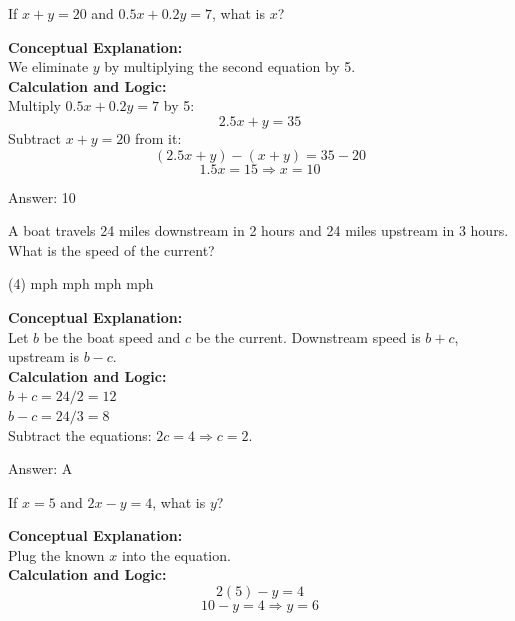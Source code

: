 \documentclass[11pt,paper=a4,answers]{exam}
\begin{document}
\begin{questions}
\question
If $x + y = 20$ and $0.5x + 0.2y = 7$, what is $x$?

\begin{solution}
\textbf{Conceptual Explanation:} \\
We eliminate $y$ by multiplying the second equation by 5.
\\[10pt]
\textbf{Calculation and Logic:} \\
Multiply $0.5x + 0.2y = 7$ by 5:
\[2.5x + y = 35\]
Subtract $x + y = 20$ from it:
\[(2.5x + y) - (x + y) = 35 - 20\]
\[1.5x = 15 \Rightarrow x = 10\]

\vspace{15pt}
Answer: \colorbox{yellow!100}{10}
\end{solution}

\question
A boat travels 24 miles downstream in 2 hours and 24 miles upstream in 3 hours. What is the speed of the current?
\begin{tasks}(4)
     mph
     mph
     mph
     mph
\end{tasks}

\begin{solution}
\textbf{Conceptual Explanation:} \\
Let $b$ be the boat speed and $c$ be the current. Downstream speed is $b+c$, upstream is $b-c$.
\\[10pt]
\textbf{Calculation and Logic:} \\
$b + c = 24 / 2 = 12$ \\
$b - c = 24 / 3 = 8$ \\
Subtract the equations: $2c = 4 \Rightarrow c = 2$.

\vspace{15pt}
Answer: \colorbox{yellow!100}{A}
\end{solution}

\question
If $x = 5$ and $2x - y = 4$, what is $y$?

\begin{solution}
\textbf{Conceptual Explanation:} \\
Plug the known $x$ into the equation.
\\[10pt]
\textbf{Calculation and Logic:} \\
\[2(5) - y = 4\]
\[10 - y = 4 \Rightarrow y = 6\]


\end{solution}
\end{questions}
\end{document}
